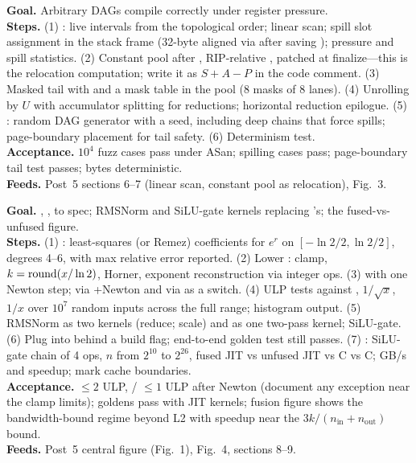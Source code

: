 \textbf{Goal.} Arbitrary DAGs compile correctly under register pressure.\\
\textbf{Steps.} (1) : live intervals from the topological order; linear scan; spill slot assignment in the stack frame (32-byte aligned via  after saving ); pressure and spill statistics. (2) Constant pool after , RIP-relative , patched at finalize---this is the relocation computation; write it as $S + A - P$ in the code comment. (3) Masked tail with  and a mask table in the pool (8 masks of 8 lanes). (4) Unrolling by $U$ with accumulator splitting for reductions; horizontal reduction epilogue. (5) : random DAG generator with a seed, including deep chains that force spills; page-boundary placement for tail safety. (6) Determinism test.\\
\textbf{Acceptance.} $10^4$ fuzz cases pass under ASan; spilling cases pass; page-boundary tail test passes; bytes deterministic.\\
\textbf{Feeds.} Post~5 sections 6--7 (linear scan, constant pool as relocation), Fig.~3.

\textbf{Goal.} , ,  to spec; RMSNorm and SiLU-gate kernels replacing 's; the fused-vs-unfused figure.\\
\textbf{Steps.} (1) : least-squares (or Remez) coefficients for $e^r$ on $[-\ln 2/2, \ln 2/2]$, degrees 4--6, with max relative error reported. (2) Lower : clamp, $k = \operatorname{round}(x/\ln 2)$, Horner, exponent reconstruction via integer ops. (3)  with one Newton step;  via +Newton and via  as a switch. (4) ULP tests against , $1/\sqrt{x}$, $1/x$ over $10^7$ random inputs across the full range; histogram output. (5) RMSNorm as two kernels (reduce; scale) and as one two-pass kernel; SiLU-gate. (6) Plug into  behind a build flag; end-to-end golden test still passes. (7) : SiLU-gate chain of 4 ops, $n$ from $2^{10}$ to $2^{26}$, fused JIT vs unfused JIT vs  C vs  C; GB/s and speedup; mark cache boundaries.\\
\textbf{Acceptance.}  $\le 2$ ULP, / $\le 1$ ULP after Newton (document any exception near the clamp limits);  goldens pass with JIT kernels; fusion figure shows the bandwidth-bound regime beyond L2 with speedup near the $3k/(n_{\text{in}}+n_{\text{out}})$ bound.\\
\textbf{Feeds.} Post~5 central figure (Fig.~1), Fig.~4, sections 8--9.


